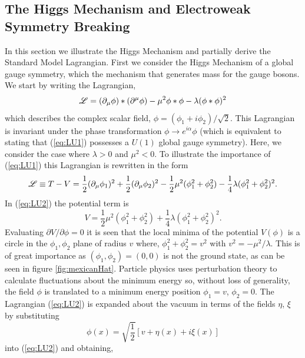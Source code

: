 \subsection{The Higgs Mechanism and Electroweak Symmetry Breaking}
In this section we illustrate the Higgs Mechanism and partially derive the
Standard Model Lagrangian. 
First we consider the Higgs Mechanism of a global gauge symmetry, 
which the mechanism that generates mass for the gauge bosons. 
We start by writing the Lagrangian, 
\begin{equation}
\mathscr{L}=(\partial_{\mu}\phi)*(\partial^{\mu}\phi) - \mu^{2}\phi*\phi - \lambda (\phi*\phi)^{2}
\label{eq:LU1}
\end{equation}
which describes the complex scalar field, $\phi=(\phi_{1}+i\phi_{2})/\sqrt{2}$.
This Lagrangian is invariant under the phase transformation $\phi\rightarrow e^{i\alpha}\phi$
(which is equivalent to stating that (\ref{eq:LU1}) possesses a $U(1)$ global gauge symmetry).
Here, we consider the case where $\lambda>0$ and $\mu^{2}<0$. To illustrate the importance of (\ref{eq:LU1})
this Lagrangian is rewritten in the form
\begin{equation}
\mathscr{L} \equiv T-V = \frac{1}{2}(\partial_{\mu}\phi_{1})^{2}+\frac{1}{2}(\partial_{\mu}\phi_{2})^{2}-\frac{1}{2}\mu^{2}(\phi_{1}^{2}+\phi_{2}^{2})-\frac{1}{4}\lambda(\phi_{1}^{2}+\phi_{2}^{2})^{2}.
\label{eq:LU2}
\end{equation}
In (\ref{eq:LU2}) the potential term is
\begin{equation}
V=\frac{1}{2}\mu^{2}(\phi_{1}^{2}+\phi_{2}^{2})+\frac{1}{4}\lambda(\phi_{1}^{2}+\phi_{2}^{2})^{2}.
\end{equation}
Evaluating $\partial V/ \partial \phi = 0$ it is seen that the local minima
of the potential $V(\phi)$ is a circle in the $\phi_{1},\phi_{2}$ plane of radius $v$ where,
$\phi_{1}^{2}+\phi_{2}^{2}=v^{2}$ with $v^{2}= - \mu^{2}/\lambda$. This 
is of great importance as $(\phi_{1},\phi_{2})=(0,0)$ is not the ground state, as can be seen in figure \ref{fig:mexicanHat}.
Particle physics uses perturbation theory to calculate fluctuations 
about the minimum energy so, without loss of generality, the field $\phi$ is translated to a minimum
energy position $\phi_{1}=v$, $\phi_{2}=0$. The Lagrangian (\ref{eq:LU2}) is
expanded about the vacuum in terms of the fields $\eta$, $\xi$ by substituting
\begin{equation}
\phi(x)=\sqrt{\frac{1}{2}}[v+\eta(x)+i\xi(x)]
\label{eq:VTerms}
\end{equation}
into (\ref{eq:LU2}) and obtaining,
